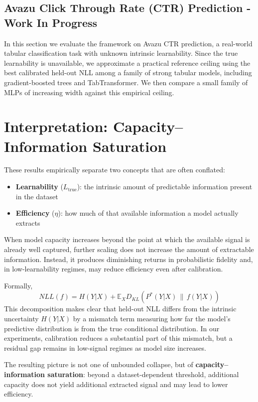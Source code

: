\documentclass{article}
\begin{document}
\subsection{Avazu Click Through Rate (CTR) Prediction - Work In Progress}
In this section we evaluate the framework on Avazu CTR prediction, 
a real-world tabular classification task with unknown intrinsic learnability. 
Since the true learnability is unavailable, we approximate a practical reference ceiling 
using the best calibrated held-out NLL among a family of strong tabular models, 
including gradient-boosted trees and TabTransformer. We then compare a small family of MLPs of 
increasing width against this empirical ceiling.



\section{Interpretation: Capacity--Information Saturation}

These results empirically separate two concepts that are often conflated:

\begin{itemize}
    \item \textbf{Learnability} ($L_{\text{true}}$): the intrinsic amount of predictable information present in the dataset
    \item \textbf{Efficiency} ($\eta$): how much of that available information a model actually extracts
\end{itemize}
When model capacity increases beyond the point at which the available signal is already well captured, further scaling does not increase the amount of extractable information. Instead, it produces diminishing returns in probabilistic fidelity and, in low-learnability regimes, may reduce efficiency even after calibration.

Formally,
\[
NLL(f) = H(Y|X) + \mathbb{E}_X D_{KL}\!\left(P^*(Y|X)\,\|\,f(Y|X)\right)
\]
This decomposition makes clear that held-out NLL differs from the intrinsic uncertainty $H(Y|X)$ by a mismatch term measuring how far the model's predictive distribution is from the true conditional distribution. In our experiments, calibration reduces a substantial part of this mismatch, but a residual gap remains in low-signal regimes as model size increases.

The resulting picture is not one of unbounded collapse, but of \textbf{capacity--information saturation}: beyond a dataset-dependent threshold, additional capacity does not yield additional extracted signal and may lead to lower efficiency.
\end{document}
